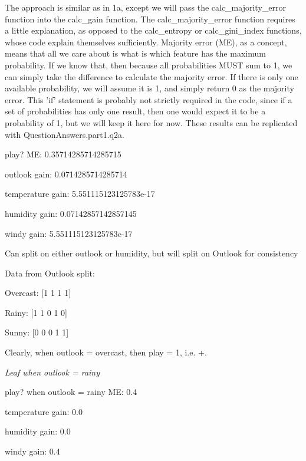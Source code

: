 \documentclass[12pt, fullpage,letterpaper]{article}
\begin{document}
\begin{enumerate}
\begin{enumerate}
	The approach is similar as in 1a, except we will pass the calc\_majority\_error function into the calc\_gain function. The calc\_majority\_error function requires a little explanation, as opposed to the calc\_entropy or calc\_gini\_index functions, whose code explain themselves sufficiently. Majority error (ME), as a concept, means that all we care about is what is which feature has the maximum probability. If we know that, then because all probabilities MUST sum to 1, we can simply take the difference to calculate the majority error. If there is only one available probability, we will assume it is 1, and simply return 0 as the majority error. This 'if' statement is probably not strictly required in the code, since if a set of probabilities has only one result, then one would expect it to be a probability of 1, but we will keep it here for now. These results can be replicated with QuestionAnswers.part1.q2a.
	
    \vspace{5mm}

	play? ME:  0.35714285714285715
	
    outlook gain: 0.0714285714285714
    
    temperature gain: 5.551115123125783e-17
    
    humidity gain: 0.07142857142857145
    
    windy gain: 5.551115123125783e-17
    
    \vspace{5mm}

    Can split on either outlook or humidity, but will split on Outlook for consistency
    
    \vspace{5mm}
    
    Data from Outlook split:
    
    Overcast: [1 1 1 1]
    
    Rainy: [1 1 0 1 0]
    
    Sunny: [0 0 0 1 1]
    
    Clearly, when outlook = overcast, then play = 1, i.e. +.
    
    \vspace{5mm}
    \emph{Leaf when outlook = rainy}
    
    play? when outlook = rainy ME:  0.4
    
    temperature gain: 0.0
    
    humidity gain: 0.0
    
    windy gain: 0.4
    

\end{enumerate}
\end{enumerate}
\end{document}
